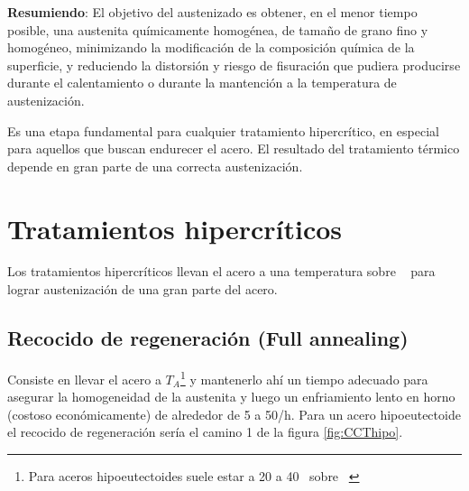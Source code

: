 {\bf Resumiendo}: El objetivo del austenizado es obtener, en el menor tiempo posible, una austenita químicamente homogénea, de tamaño de grano fino y homogéneo, minimizando la modificación de la composición química de la superficie, y reduciendo la distorsión y riesgo de fisuración que pudiera producirse durante el calentamiento o durante la mantención a la temperatura de austenización. 

Es una etapa fundamental para cualquier tratamiento hipercrítico, en especial para aquellos que buscan endurecer el acero. El resultado del tratamiento térmico depende en gran parte de una correcta austenización.

\section{Tratamientos hipercríticos}
Los tratamientos hipercr\'iticos llevan el acero a una temperatura sobre \Athree~ para lograr austenizaci\'on de una gran parte del acero.
\subsection[Recocido de regeneración]{Recocido de regeneración (Full annealing)}
Consiste en llevar el acero a $T_A$\footnote{Para aceros hipoeutectoides suele estar a 20 a 40\grad~ sobre \Athree~} y mantenerlo ahí un tiempo adecuado para asegurar la homogeneidad de la austenita y luego un enfriamiento lento en horno (costoso económicamente) de alrededor de 5 a 50\grad{}/h. Para un acero hipoeutectoide el recocido de regeneraci\'on ser\'ia el camino 1 de la figura \ref{fig:CCThipo}.


